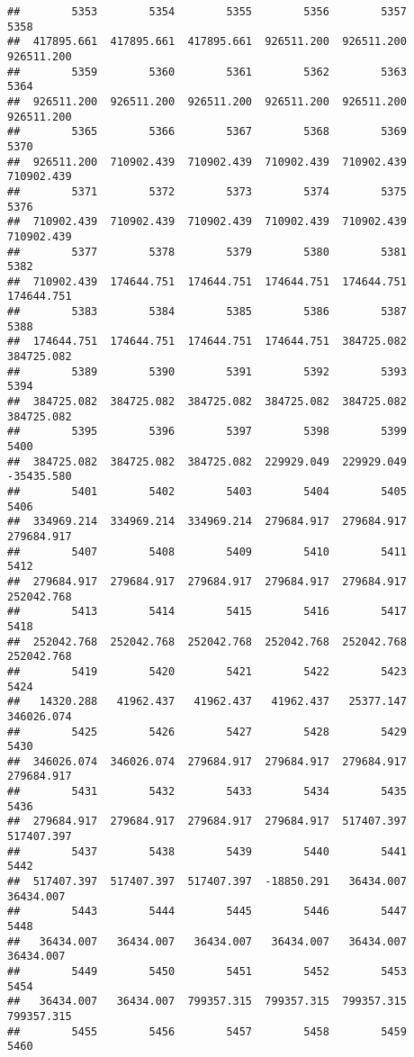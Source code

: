 \documentclass[
]{book}
\begin{document}
\begin{verbatim}
##        5353        5354        5355        5356        5357        5358 
##  417895.661  417895.661  417895.661  926511.200  926511.200  926511.200 
##        5359        5360        5361        5362        5363        5364 
##  926511.200  926511.200  926511.200  926511.200  926511.200  926511.200 
##        5365        5366        5367        5368        5369        5370 
##  926511.200  710902.439  710902.439  710902.439  710902.439  710902.439 
##        5371        5372        5373        5374        5375        5376 
##  710902.439  710902.439  710902.439  710902.439  710902.439  710902.439 
##        5377        5378        5379        5380        5381        5382 
##  710902.439  174644.751  174644.751  174644.751  174644.751  174644.751 
##        5383        5384        5385        5386        5387        5388 
##  174644.751  174644.751  174644.751  174644.751  384725.082  384725.082 
##        5389        5390        5391        5392        5393        5394 
##  384725.082  384725.082  384725.082  384725.082  384725.082  384725.082 
##        5395        5396        5397        5398        5399        5400 
##  384725.082  384725.082  384725.082  229929.049  229929.049  -35435.580 
##        5401        5402        5403        5404        5405        5406 
##  334969.214  334969.214  334969.214  279684.917  279684.917  279684.917 
##        5407        5408        5409        5410        5411        5412 
##  279684.917  279684.917  279684.917  279684.917  279684.917  252042.768 
##        5413        5414        5415        5416        5417        5418 
##  252042.768  252042.768  252042.768  252042.768  252042.768  252042.768 
##        5419        5420        5421        5422        5423        5424 
##   14320.288   41962.437   41962.437   41962.437   25377.147  346026.074 
##        5425        5426        5427        5428        5429        5430 
##  346026.074  346026.074  279684.917  279684.917  279684.917  279684.917 
##        5431        5432        5433        5434        5435        5436 
##  279684.917  279684.917  279684.917  279684.917  517407.397  517407.397 
##        5437        5438        5439        5440        5441        5442 
##  517407.397  517407.397  517407.397  -18850.291   36434.007   36434.007 
##        5443        5444        5445        5446        5447        5448 
##   36434.007   36434.007   36434.007   36434.007   36434.007   36434.007 
##        5449        5450        5451        5452        5453        5454 
##   36434.007   36434.007  799357.315  799357.315  799357.315  799357.315 
##        5455        5456        5457        5458        5459        5460 

\end{verbatim}
\end{document}

